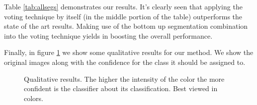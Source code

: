 \documentclass[10pt,twocolumn,letterpaper]{article}
\begin{document}
Table \ref{tab:allsegs} demonstrates our results. It's clearly seen that applying the voting technique by itself
(in the middle portion of the table) outperforms the state of the art results.
Making use of the bottom up segmentation combination into the voting technique yields in boosting the overall performance.

Finally, in figure  \ref{fig:qualitative} we show some qualitative results for our method. We show the original
images along with the confidence for the class it should be assigned to.

\begin{figure}
\centering
\caption{Qualitative results. The higher the intensity of the color the more confident is the classifier about its classification. Best viewed in colors.}
\label{fig:qualitative}
\end{figure}
\end{document}
